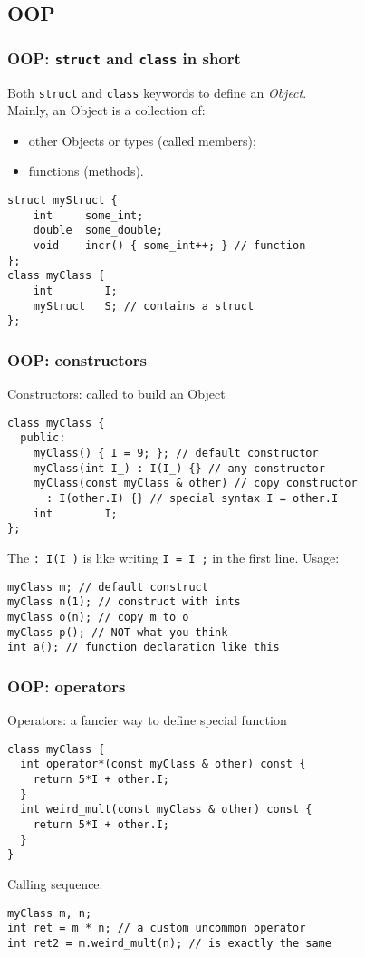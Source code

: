 \documentclass{beamer}
\newcommand{\code}[1]{{\color{cgreen}\texttt{#1}}}
\begin{document}
\subsection{OOP}

\begin{frame}[fragile]
 \frametitle{OOP: \code{struct} and \code{class} in short}
 Both \code{struct} and \code{class} keywords to define an \emph{Object}. \\
 Mainly, an Object is a collection of:
 \begin{itemize}
  \item other Objects or types (called members);
  \item functions (methods).
 \end{itemize}
 \begin{lstlisting}
struct myStruct {
    int     some_int;
    double  some_double;
    void    incr() { some_int++; } // function
};
class myClass {
    int        I;
    myStruct   S; // contains a struct
};
 \end{lstlisting}
\end{frame}

\begin{frame}[fragile]
 \frametitle{OOP: constructors}
 Constructors: called to build an Object
 \begin{lstlisting}
class myClass {
  public:
    myClass() { I = 9; }; // default constructor
    myClass(int I_) : I(I_) {} // any constructor
    myClass(const myClass & other) // copy constructor
      : I(other.I) {} // special syntax I = other.I
    int        I;
};
  \end{lstlisting}
  The \code{: I(I\_)} is like writing \code{I = I\_;} in the first line. Usage:
 \begin{lstlisting}
myClass m; // default construct
myClass n(1); // construct with ints
myClass o(n); // copy m to o
myClass p(); // NOT what you think
int a(); // function declaration like this
 \end{lstlisting}
\end{frame}

\begin{frame}[fragile]
 \frametitle{OOP: operators}
 Operators: a fancier way to define special function
  \begin{lstlisting}
class myClass {
  int operator*(const myClass & other) const {
    return 5*I + other.I;
  }
  int weird_mult(const myClass & other) const {
    return 5*I + other.I;
  }
}
  \end{lstlisting}
  Calling  sequence:
 \begin{lstlisting}
myClass m, n;
int ret = m * n; // a custom uncommon operator
int ret2 = m.weird_mult(n); // is exactly the same
 \end{lstlisting}
\end{frame}
\end{document}

